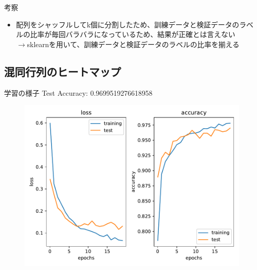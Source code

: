 \documentclass{beamer}
\begin{document}
  \begin{frame}{考察}
    \begin{itemize}
      \item 配列をシャッフルしてk個に分割したため、訓練データと検証データのラベルの比率が毎回バラバラになっているため、結果が正確とは言えない\mbox{}\\ $\rightarrow$sklearnを用いて、訓練データと検証データのラベルの比率を揃える
    \end{itemize}
  \end{frame}

  \begin{frame}
    \section{混同行列のヒートマップ}
  \end{frame}

  \begin{frame}{学習の様子}
    Test Accuracy: 0.9699519276618958
    \begin{figure}[H]
      \centering
      \includegraphics[keepaspectratio, scale=0.5]{images/deep_conv.pdf}
    \end{figure}
  \end{frame}
\end{document}
